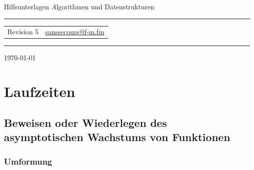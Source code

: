 \documentclass[a4paper, 12pt]{article}
\makeatletter
\newcommand{\TITLE}{Hilfsunterlagen}
\newcommand{\TITLEDESCRIPTION}{Algorithmen und Datenstrukturen}
\newcommand{\REVISION}{5}
\newcommand{\MAILONE}{\href{mailto:sanssecours@f-m.fm}{sanssecours@f-m.fm}}
\makeatother
\begin{document}
\begin{titlepage}
	\begin{center}
		{\Huge\zapfino \TITLE}
		\vskip 1cm
		{\Large\textit\TITLEDESCRIPTION}
		\vskip 2cm
		\hrule
		\vskip 0.5cm
		\begin{tabular}{p{8cm}l}
			Revision \REVISION	& \MAILONE\\
		\end{tabular}
		\vskip 0.5cm
		\hrule
		\vskip 11cm
	\end{center}
	\begin{flushright}
		\today
	\end{flushright}
\end{titlepage}


\makeatletter \renewcommand{\@dotsep}{10000} \makeatother
\newpage
\setcounter{page}{2}
\tableofcontents
\newpage
\pagestyle{scrheadings}


\begin{abstract}
	\noindent Dieser Text ist mit der Absicht entstanden zu helfen. Ich habe ihn somit natürlich nicht aus Absicht mit Fehlern gespickt. Trotzdem ist es doch sehr wahrscheinlich, dass er Fehler enthält. Ich bitte das zu Entschuldigen, und möchte damit den Hinweis geben, dass für jeglichen Inhalt dieses Textes \emph{absolut kein Gewähr auf Richtigkeit} gegeben wird.\\

	\noindent Solltet ihr Fehler im Text finden wäre es sehr nett wenn ihr mir eine \href{mailto:sanssecours@f-m.fm}{e-Mail} schreibt, damit ich sie ausbessern kann.
\end{abstract}

\section{Laufzeiten}

\subsection{Beweisen oder Wiederlegen des asymptotischen Wachstums von Funktionen}

\subsubsection{Umformung}
\end{document}
